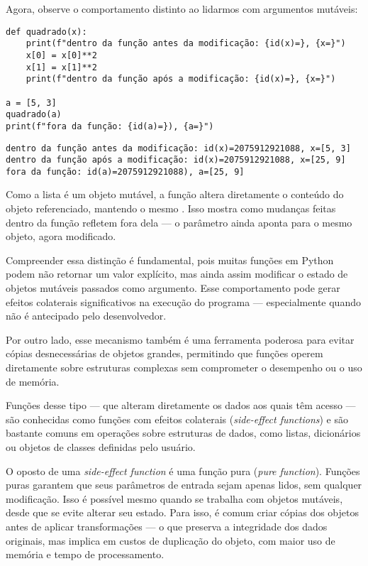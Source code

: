 Agora, observe o comportamento distinto ao lidarmos com argumentos mutáveis:
\begin{verbatim}
def quadrado(x):
    print(f"dentro da função antes da modificação: {id(x)=}, {x=}")
    x[0] = x[0]**2
    x[1] = x[1]**2
    print(f"dentro da função após a modificação: {id(x)=}, {x=}")

a = [5, 3]
quadrado(a)
print(f"fora da função: {id(a)=}), {a=}")
\end{verbatim}
\begin{verbatim}
dentro da função antes da modificação: id(x)=2075912921088, x=[5, 3]
dentro da função após a modificação: id(x)=2075912921088, x=[25, 9]
fora da função: id(a)=2075912921088), a=[25, 9]
\end{verbatim}

Como a lista é um objeto mutável, a função altera diretamente o conteúdo do objeto referenciado,
mantendo o mesmo .
Isso mostra como mudanças feitas dentro da função refletem fora dela --- o parâmetro ainda aponta para o mesmo objeto,
agora modificado.


Compreender essa distinção é fundamental, pois muitas funções em Python podem não retornar um valor explícito, mas
ainda assim modificar o estado de objetos mutáveis passados como argumento.
Esse comportamento pode gerar efeitos colaterais significativos na execução do programa --- especialmente quando
não é antecipado pelo desenvolvedor.


Por outro lado, esse mecanismo também é uma ferramenta poderosa para evitar cópias desnecessárias de objetos grandes,
permitindo que funções operem diretamente sobre estruturas complexas sem comprometer o desempenho ou o uso de memória.


Funções desse tipo --- que alteram diretamente os dados aos quais têm acesso --- são conhecidas como funções com
efeitos colaterais (\emph{side-effect functions}) e são bastante comuns em operações sobre estruturas de dados,
como listas, dicionários ou objetos de classes definidas pelo usuário.

O oposto de uma \emph{side-effect function} é uma função pura (\emph{pure function}).
Funções puras garantem que seus parâmetros de entrada sejam apenas lidos, sem qualquer modificação.
Isso é possível mesmo quando se trabalha com objetos mutáveis, desde que se evite alterar seu estado.
Para isso, é comum criar cópias dos objetos antes de aplicar transformações --- o que preserva a integridade dos
dados originais, mas implica em custos de duplicação do objeto, com maior uso de memória e tempo de processamento.

